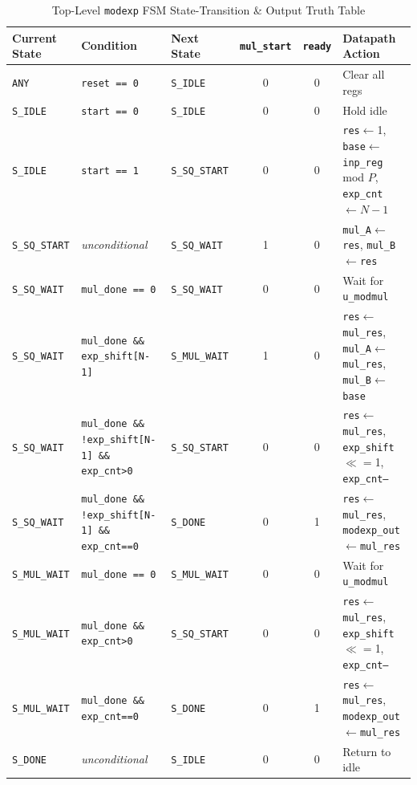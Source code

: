 \documentclass[11pt,a4paper]{article}
\begin{document}
\begin{table}[h!]
\centering
\caption{Top-Level \texttt{modexp} FSM State-Transition \& Output Truth Table}
\label{tab:fsm_tt}
\scriptsize
\begin{tabular}{@{}lp{3.6cm}lccp{3.6cm}@{}}
\toprule
\textbf{Current State} & \textbf{Condition} & \textbf{Next State} & \textbf{\texttt{mul\_start}} & \textbf{\texttt{ready}} & \textbf{Datapath Action} \\
\midrule
\texttt{ANY} & \texttt{reset == 0} & \texttt{S\_IDLE} & 0 & 0 & Clear all regs \\
\texttt{S\_IDLE} & \texttt{start == 0} & \texttt{S\_IDLE} & 0 & 0 & Hold idle \\
\texttt{S\_IDLE} & \texttt{start == 1} & \texttt{S\_SQ\_START} & 0 & 0 & \texttt{res}$\leftarrow$1, \texttt{base}$\leftarrow$\texttt{inp\_reg} mod $P$, \texttt{exp\_cnt}$\leftarrow N{-}1$ \\
\texttt{S\_SQ\_START} & \textit{unconditional} & \texttt{S\_SQ\_WAIT} & 1 & 0 & \texttt{mul\_A}$\leftarrow$\texttt{res}, \texttt{mul\_B}$\leftarrow$\texttt{res} \\
\texttt{S\_SQ\_WAIT} & \texttt{mul\_done == 0} & \texttt{S\_SQ\_WAIT} & 0 & 0 & Wait for \texttt{u\_modmul} \\
\texttt{S\_SQ\_WAIT} & \texttt{mul\_done \&\& exp\_shift[N-1]} & \texttt{S\_MUL\_WAIT} & 1 & 0 & \texttt{res}$\leftarrow$\texttt{mul\_res}, \texttt{mul\_A}$\leftarrow$\texttt{mul\_res}, \texttt{mul\_B}$\leftarrow$\texttt{base} \\
\texttt{S\_SQ\_WAIT} & \texttt{mul\_done \&\& !exp\_shift[N-1] \&\& exp\_cnt>0} & \texttt{S\_SQ\_START} & 0 & 0 & \texttt{res}$\leftarrow$\texttt{mul\_res}, \texttt{exp\_shift}$\ll=$1, \texttt{exp\_cnt--} \\
\texttt{S\_SQ\_WAIT} & \texttt{mul\_done \&\& !exp\_shift[N-1] \&\& exp\_cnt==0} & \texttt{S\_DONE} & 0 & 1 & \texttt{res}$\leftarrow$\texttt{mul\_res}, \texttt{modexp\_out}$\leftarrow$\texttt{mul\_res} \\
\texttt{S\_MUL\_WAIT} & \texttt{mul\_done == 0} & \texttt{S\_MUL\_WAIT} & 0 & 0 & Wait for \texttt{u\_modmul} \\
\texttt{S\_MUL\_WAIT} & \texttt{mul\_done \&\& exp\_cnt>0} & \texttt{S\_SQ\_START} & 0 & 0 & \texttt{res}$\leftarrow$\texttt{mul\_res}, \texttt{exp\_shift}$\ll=$1, \texttt{exp\_cnt--} \\
\texttt{S\_MUL\_WAIT} & \texttt{mul\_done \&\& exp\_cnt==0} & \texttt{S\_DONE} & 0 & 1 & \texttt{res}$\leftarrow$\texttt{mul\_res}, \texttt{modexp\_out}$\leftarrow$\texttt{mul\_res} \\
\texttt{S\_DONE} & \textit{unconditional} & \texttt{S\_IDLE} & 0 & 0 & Return to idle \\
\bottomrule
\end{tabular}
\end{table}
\end{document}
